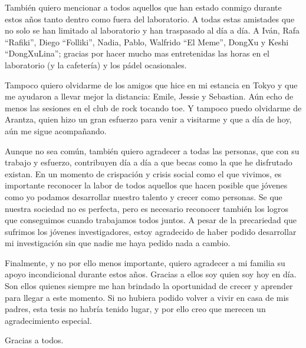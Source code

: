 También quiero mencionar a todos aquellos que han estado conmigo durante estos años tanto dentro como fuera del laboratorio.
A todas estas amistades que no solo se han limitado al laboratorio y han traspasado al día a día.
A Iván, Rafa ``Rafiki'', Diego ``Folliki'', Nadia, Pablo, Walfrido ``El Meme'', DongXu y Keshi ``DongXuLina''; gracias por hacer mucho mas entretenidas las horas en el laboratorio (y la cafetería) y los pádel ocasionales.

Tampoco quiero olvidarme de los amigos que hice en mi estancia en Tokyo y que me ayudaron a llevar mejor la distancia: Emile, Jessie y Sebastian.
Aún echo de menos las sesiones en el club de rock tocando toe.
Y tampoco puedo olvidarme de Arantza, quien hizo un gran esfuerzo para venir a visitarme y que a día de hoy, aún me sigue acompañando.

Aunque no sea común, también quiero agradecer a todas las personas, que con su trabajo y esfuerzo, contribuyen día a día a que becas como la que he disfrutado existan.
En un momento de crispación y crisis social como el que vivimos, es importante reconocer la labor de todos aquellos que hacen posible que jóvenes como yo podamos desarrollar nuestro talento y crecer como personas.
Se que nuestra sociedad no es perfecta, pero es necesario reconocer también los logros que conseguimos cuando trabajamos todos juntos.
A pesar de la precariedad que sufrimos los jóvenes investigadores, estoy agradecido de haber podido desarrollar mi investigación sin que nadie me haya pedido nada a cambio.

Finalmente, y no por ello menos importante, quiero agradecer a mi familia su apoyo incondicional durante estos años.
Gracias a ellos soy quien soy hoy en día.
Son ellos quienes siempre me han brindado la oportunidad de crecer y aprender para llegar a este momento.
Si no hubiera podido volver a vivir en casa de mis padres, esta tesis no habría tenido lugar, y por ello creo que merecen un agradecimiento especial.

Gracias a todos.




